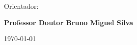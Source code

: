 \vspace{0,5cm}
\begin{center}
\begin{normalsize}
\begin{large}
Orientador:
\end{large}
\end{normalsize}
\end{center}

\vspace{0.2cm}
\begin{center}
\begin{large}
\textbf{Professor Doutor Bruno Miguel Silva}
\end{large}
\end{center}



\vspace{0.5cm}
\begin{center}
\begin{normalsize}
\today
\end{normalsize}
\end{center}
